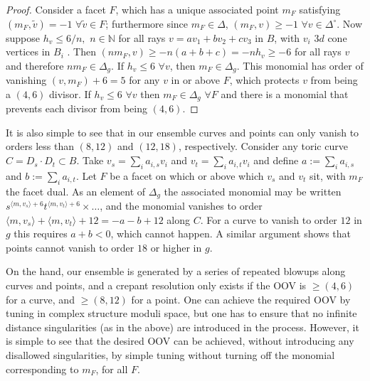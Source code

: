 \documentclass[aps,prl,twocolumn, superscriptaddress,groupedaddress,nofootinbib]{revtex4-1}
\newcommand{\vev}[1]{\langle #1 \rangle}
\begin{document}
\begin{proof}
Consider a facet
$F$, which has a unique associated point $m_F$ satisfying
$(m_F,\tilde v)=-1 \,\, \forall \tilde v \in F$; furthermore
since $m_F\in\Delta$, 
$(m_F,v)\geq -1\,\, \forall v\in\Delta^\circ$. Now
suppose $h_v \leq 6/n, \,\, n \in \mathbb{N}$  
for all rays $v=av_1 + b v_2 + c v_3$
in $B$, with $v_i$ $3d$ cone vertices in $B_i$ . Then 
$(nm_F, v)\geq -n(a+b+c)=-nh_v\geq -6$ for all rays $v$ and
therefore $nm_F \in \Delta_g.$ If $h_v\leq 6\,\, \forall v$,
then $m_F\in\Delta_g$. This monomial has order of vanishing
$(v,m_F)+6=5$ for any $v$ in or above $F$, which protects
$v$ from being a $(4,6)$ divisor. If
$h_v\leq 6 \,\, \forall v$ then $m_F \in \Delta_g\,\, \forall F$
and there is a monomial that prevents
each divisor from being $(4,6)$.
\end{proof}

It is also simple to see that in our ensemble curves and points can only vanish to orders less than $(8,12)$ and $(12,18)$, respectively. Consider any toric curve $C=D_s\cdot D_t \subset B$. Take $v_s=\sum_i a_{i,s} v_i$ and $v_t=\sum_i a_{i,t} v_i$ and define $a:=\sum_i a_{i,s}$ and $b:=\sum_i a_{i,t}$. Let $F$ be a facet
on which or above which $v_s$ and $v_t$ sit, with $m_F$ the facet dual. As an
element of $\Delta_g$ the associated monomial may be written
$s^{\vev{m,v_s}+6}t^{\vev{m,v_t}+6}\times \dots$,
and the monomial vanishes to order $\vev{m,v_s}+\vev{m,v_t}+12=-a-b+12$ along $C$. For a curve to vanish to order $12$ in $g$ this requires $a+ b <0$, which cannot happen. A similar argument shows that points cannot vanish to order $18$ or higher in $g$.

On the hand, our ensemble is generated by a series of repeated blowups along curves and points, and a crepant resolution only exists if the OOV is $\geq (4,6)$ for a curve, and $\geq (8,12)$  for a point. One can achieve the required OOV by tuning in complex structure moduli space, but one has to ensure that no infinite distance singularities (as in the above) are introduced in the process. However, it is simple to see that the desired OOV can be achieved, without introducing any disallowed singularities, by simple tuning without turning off the monomial corresponding to $m_F$, for all $F$. 
\end{document}
